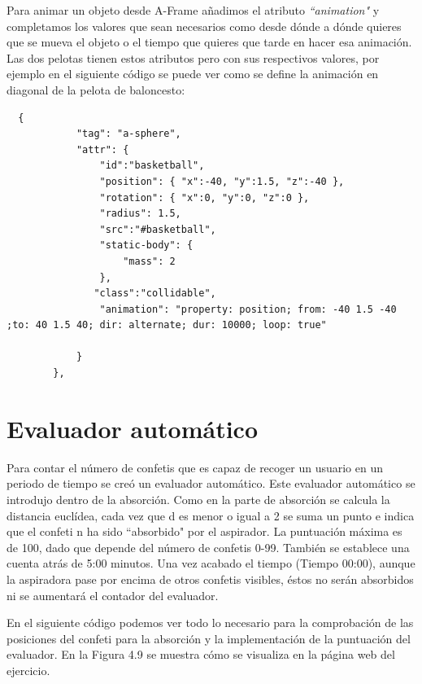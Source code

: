Para animar un objeto desde A-Frame añadimos el atributo \textit{``animation"} y completamos los valores que sean necesarios como desde dónde a dónde quieres que se mueva  el objeto o el tiempo que quieres que tarde en hacer esa animación. Las dos pelotas tienen estos atributos pero con sus respectivos valores, por ejemplo en el siguiente código se puede ver como se define la animación en diagonal de la pelota de baloncesto: 
\begin{lstlisting}
  {
            "tag": "a-sphere",
            "attr": {
                "id":"basketball",
                "position": { "x":-40, "y":1.5, "z":-40 },
                "rotation": { "x":0, "y":0, "z":0 },
                "radius": 1.5,
                "src":"#basketball",
                "static-body": {
                    "mass": 2
                },              
	           "class":"collidable",
                "animation": "property: position; from: -40 1.5 -40 ;to: 40 1.5 40; dir: alternate; dur: 10000; loop: true"

            }
        },

\end{lstlisting}



\section{Evaluador automático}
Para contar el número de confetis que es capaz de recoger un usuario en un periodo de tiempo se creó un evaluador automático. Este evaluador automático se introdujo dentro de la absorción. Como en la parte de absorción se calcula la distancia euclídea, cada vez que d es menor o igual a 2 se suma un punto e indica que el confeti n ha sido  ``absorbido" por el aspirador. La puntuación máxima es de 100, dado que depende del número de confetis 0-99. También se establece una cuenta atrás de 5:00 minutos. Una vez acabado el tiempo (Tiempo 00:00), aunque la aspiradora pase por encima de otros confetis visibles, éstos no serán absorbidos ni se aumentará el contador del evaluador.


En el siguiente código podemos ver todo lo necesario para la comprobación de las posiciones del confeti para la absorción y la implementación de la puntuación del evaluador. En la Figura 4.9 se muestra cómo se visualiza en la página web del ejercicio.

